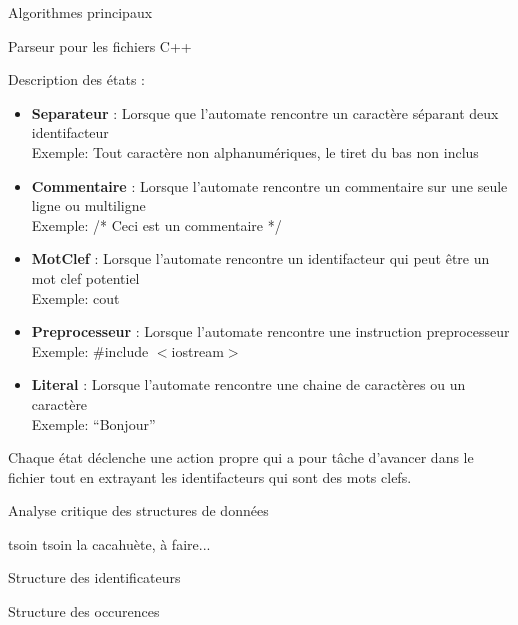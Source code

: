 \documentclass{article}
\begin{document}
\begin{section}{Algorithmes principaux}
\begin{subsection}{Parseur pour les fichiers C++}
  \begin{paragraph}{Description des états :}
   \begin{itemize}
    \item \textbf{Separateur} : Lorsque que l'automate rencontre un caractère séparant deux identifacteur\\Exemple: Tout caractère non alphanumériques, le tiret du bas non inclus
    \item \textbf{Commentaire} : Lorsque l'automate rencontre un commentaire sur une seule ligne ou multiligne \\Exemple: /* Ceci est un commentaire */
    \item \textbf{MotClef} : Lorsque l'automate rencontre un identifacteur qui peut être un mot clef potentiel \\Exemple: cout
    \item \textbf{Preprocesseur} : Lorsque l'automate rencontre une instruction preprocesseur \\Exemple: \#include $<$iostream$>$
    \item \textbf{Literal} : Lorsque l'automate rencontre une chaine de caractères ou un caractère\\Exemple: ``Bonjour''\\
   \end{itemize}
  \end{paragraph}
  
  Chaque état déclenche une action propre qui a pour tâche d'avancer dans le fichier tout en extrayant les identifacteurs qui sont des mots clefs.
  \end{subsection}

\end{section}



\begin{section}{Analyse critique des structures de données}

tsoin tsoin la cacahuète, à faire...

  \begin{subsection}{Structure des identificateurs}
  \end{subsection}

  \begin{subsection}{Structure des occurences}
  \end{subsection}

\end{section}
\end{document}
